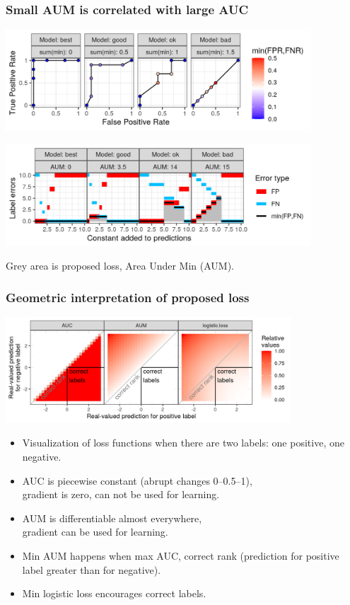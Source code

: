 \documentclass[t]{beamer}
\begin{document}
\begin{frame}
  \frametitle{Small AUM is correlated with large AUC} 
  
  \includegraphics[height=1.5in]{figure-more-than-one-binary-dots}

  \includegraphics[height=1.5in]{figure-more-than-one-binary-aum}

  Grey area is proposed loss, Area Under Min (AUM).
  
\end{frame}

\begin{frame}
  \frametitle{Geometric interpretation of proposed loss}
  
    \centering
    \includegraphics[width=0.8\textwidth]{figure-compare-hinge-loss}

    \begin{itemize}
    \item Visualization of loss functions when there are two labels: one
      positive, one negative.
    \item AUC is piecewise constant (abrupt changes 0--0.5--1),\\
      gradient is zero, can not be used for learning.
    \item AUM is differentiable almost everywhere,\\
      gradient can be used for learning.
    \item Min AUM happens when max AUC, correct rank (prediction
      for positive label greater than for negative).
    \item Min logistic loss encourages correct labels. 
    \end{itemize}
\end{frame}
\end{document}
